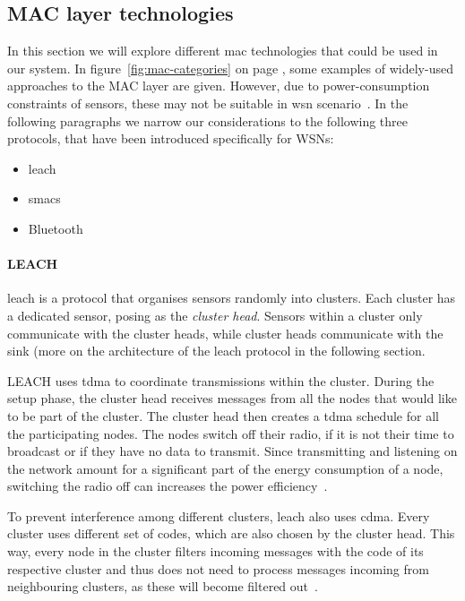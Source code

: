 \subsection{MAC layer technologies}

In this section we will explore different \acrshort{mac} technologies that could be used in our system. In figure~\ref{fig:mac-categories} on page \pageref{fig:mac-categories}, some examples of widely-used approaches to the MAC layer are given. However, due to power-consumption constraints of sensors, these may not be suitable in \acrshort{wsn} scenario~\cite{Sohraby2007WirelessApplications}. In the following paragraphs we narrow our considerations to the following three protocols, that have been introduced specifically for WSNs:
\begin{itemize}[noitemsep]
    \item \acrfull{leach}
    \item \acrfull{smacs}
    \item Bluetooth
\end{itemize}

\paragraph{LEACH}
\acrshort{leach} is a protocol that organises sensors randomly into clusters. Each cluster has a dedicated sensor, posing as the \textit{cluster head}. Sensors within a cluster only communicate with the cluster heads, while cluster heads communicate with the sink (more on the architecture of the \acrshort{leach} protocol in the following section.

LEACH uses \acrfull{tdma} to coordinate transmissions within the cluster. During the setup phase, the cluster head receives messages from all the nodes that would like to be part of the cluster. The cluster head then creates a \acrshort{tdma} schedule for all the participating nodes. The nodes switch off their radio, if it is not their time to broadcast or if they have no data to transmit. Since transmitting and listening on the network amount for a significant part of the energy consumption of a node, switching the radio off can increases the power efficiency~\cite{Sohraby2007WirelessApplications, Heinzelman2000Energy-efficientNetworks}.

To prevent interference among different clusters, \acrshort{leach} also uses \acrfull{cdma}. Every cluster uses different set of codes, which are also chosen by the cluster head. This way, every node in the cluster filters incoming messages with the code of its respective cluster and thus does not need to process messages incoming from neighbouring clusters, as these will become filtered out~\cite{Heinzelman2000Energy-efficientNetworks}.

